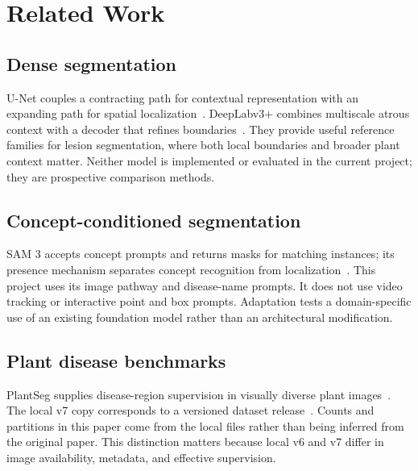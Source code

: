 \section{Related Work}
\subsection{Dense segmentation}
U-Net couples a contracting path for contextual representation with an expanding path for spatial localization~\cite{unet}. DeepLabv3+ combines multiscale atrous context with a decoder that refines boundaries~\cite{deeplab}. They provide useful reference families for lesion segmentation, where both local boundaries and broader plant context matter. Neither model is implemented or evaluated in the current project; they are prospective comparison methods.

\subsection{Concept-conditioned segmentation}
SAM 3 accepts concept prompts and returns masks for matching instances; its presence mechanism separates concept recognition from localization~\cite{sam3}. This project uses its image pathway and disease-name prompts. It does not use video tracking or interactive point and box prompts. Adaptation tests a domain-specific use of an existing foundation model rather than an architectural modification.

\subsection{Plant disease benchmarks}
PlantSeg supplies disease-region supervision in visually diverse plant images~\cite{plantseg}. The local v7 copy corresponds to a versioned dataset release~\cite{plantsegv7}. Counts and partitions in this paper come from the local files rather than being inferred from the original paper. This distinction matters because local v6 and v7 differ in image availability, metadata, and effective supervision.

